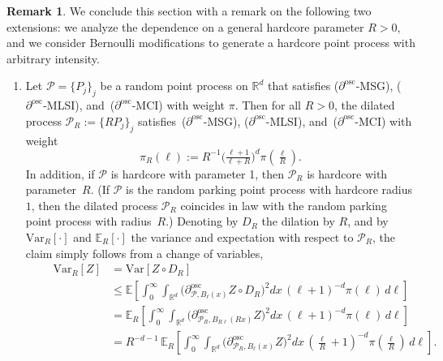 \documentclass[10pt]{amsart}
\theoremstyle{definition}\newtheorem{defi}[theo]{Definition}\newtheorem{rema}[theo]{Remark}\newtheorem{exam}[theo]{Example}\newtheorem{exem}[theo]{Example}\newtheorem{nota}[theo]{Notation}
\newcommand{\R}{\mathbb R}
\newcommand{\expecR}[1]{\mathbb{E}_R\left[#1 \right]}
\newcommand{\expec}[1]{\mathbb{E}\left[#1 \right]}
\newcommand{\Pc}{\mathcal P}
\newcommand{\osc}{\partial^{\mathrm{osc}}}
\newcommand{\oscd}[1]{\mathrel{\osc_{#1}}}
\newcommand{\var}[1]{\mathrm{Var}\left[#1\right]}
\newcommand{\varR}[1]{\mathrm{Var}_R\left[#1\right]}
\newcommand*{\alphenumi}{\renewcommand*{\theenumi}{\alph{enumi}}}
\begin{document}
\begin{rema}\label{lem:general-hardcore/decimated}
We conclude this section with a remark on the following two extensions: we analyze the dependence on a general hardcore parameter $R>0$, and we consider Bernoulli modifications to generate a hardcore point process with arbitrary intensity.
\begin{enumerate}\alphenumi
\item \label{rema3.4.1} Let $\Pc=\{P_j\}_j$ be a random point process on $\R^d$ that satisfies {($\osc$-MSG)}, {($\osc$-MLSI)}, and~{($\osc$-MCI)} with weight $\pi$. Then for all $R>0$, the dilated process $\Pc_R:=\{RP_j\}_j$ satisfies~{($\osc$-MSG)}, {($\osc$-MLSI)}, and~{($\osc$-MCI)} with weight
\[
\pi_R(\ell):= R^{-1} \big(\tfrac{\ell+1} {\ell+ R}\big)^{d}\pi(\tfrac \ell R).
\]
In addition, if $\Pc$ is hardcore with parameter 1, then $\Pc_R$ is hardcore with parameter~$R$. (If $\Pc$ is the random parking point process with hardcore radius $1$, then the dilated process $\Pc_R$ coincides in law with the random parking point process with radius~$R$.) Denoting by $D_R$ the dilation by $R$, and by $\varR{\cdot}$ and $\expecR{\cdot}$ the variance and expectation with respect to $\Pc_R$, the claim simply follows from a change of variables,
\begin{align*}
\qquad\varR{Z}&=\var{Z\circ D_R}\\
&\le \expec{\int_0^\infty\int_{\R^d} \Big(\oscd{\Pc,B_\ell(x)}Z\circ D_R\Big)^2dx\,(\ell+1)^{-d} \pi(\ell)\,d\ell}
\\
&=\expecR{\int_0^\infty\int_{\R^d} \Big(\oscd{\Pc_R,B_{R\ell}(Rx)}Z\Big)^2dx\, (\ell+1)^{-d} \pi(\ell)\,d\ell}
\\
&=R^{-d-1}\,\expecR{\int_0^\infty\int_{\R^d} \Big(\oscd{\Pc_R,B_{\ell}(x)}Z\Big)^2dx\, (\tfrac\ell R+1)^{-d} \pi(\tfrac\ell R)\,d\ell}.
\end{align*}


\end{enumerate}
\end{rema}
\end{document}
